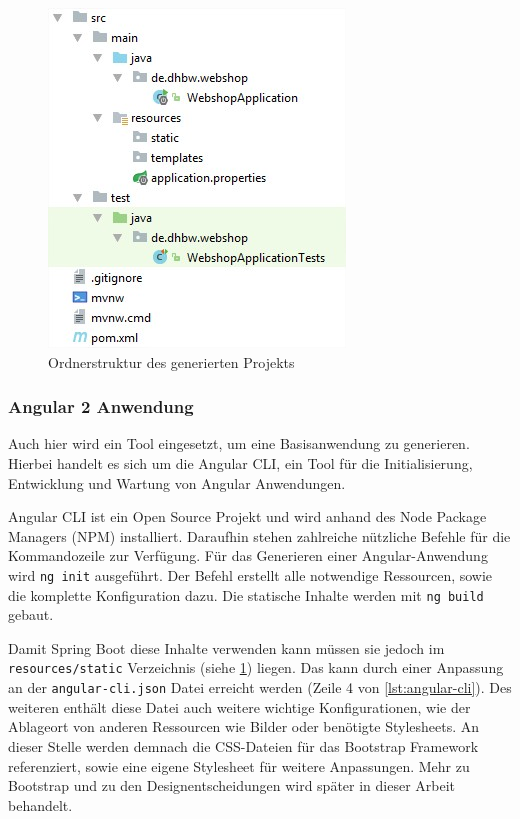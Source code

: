 \begin{figure}[th!]
	\centering
	\includegraphics[width=0.5\linewidth]{bilder/kap7/init-project}
	\caption{Ordnerstruktur des generierten Projekts}
	\label{fig:init-project}
\end{figure}

\subsubsection{Angular 2 Anwendung}
Auch hier wird ein Tool eingesetzt, um eine Basisanwendung zu generieren. Hierbei handelt es sich um die Angular CLI, ein Tool für die Initialisierung, Entwicklung und Wartung von Angular Anwendungen\cite{Arora2017}.

Angular CLI ist ein Open Source Projekt und wird anhand des Node Package Managers (\acs{NPM}) installiert. Daraufhin stehen zahlreiche nützliche Befehle für die Kommandozeile zur Verfügung. Für das Generieren einer Angular-Anwendung wird \texttt{ng init} ausgeführt. Der Befehl erstellt alle notwendige Ressourcen, sowie die komplette Konfiguration dazu. Die statische Inhalte werden mit \texttt{ng build} gebaut. 

Damit Spring Boot diese Inhalte verwenden kann müssen sie jedoch im  \texttt{resources/static} Verzeichnis (siehe \cref{fig:init-project}) liegen. Das kann durch einer Anpassung an der \texttt{angular-cli.json} Datei erreicht werden (Zeile 4 von \cref{lst:angular-cli}). Des weiteren enthält diese Datei auch weitere wichtige Konfigurationen, wie der Ablageort von anderen Ressourcen wie Bilder oder benötigte Stylesheets. An dieser Stelle werden demnach die \acs{CSS}-Dateien für das Bootstrap Framework referenziert, sowie eine eigene Stylesheet für weitere Anpassungen. Mehr zu Bootstrap und zu den Designentscheidungen wird später in dieser Arbeit behandelt.
\\


